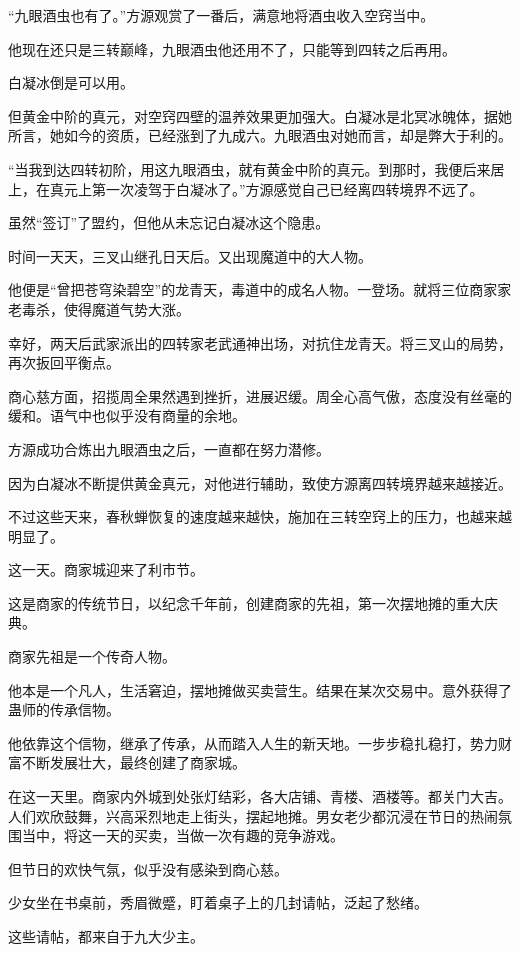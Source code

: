 \begin{this_body}
“九眼酒虫也有了。”方源观赏了一番后，满意地将酒虫收入空窍当中。

他现在还只是三转巅峰，九眼酒虫他还用不了，只能等到四转之后再用。

白凝冰倒是可以用。

但黄金中阶的真元，对空窍四壁的温养效果更加强大。白凝冰是北冥冰魄体，据她所言，她如今的资质，已经涨到了九成六。九眼酒虫对她而言，却是弊大于利的。

“当我到达四转初阶，用这九眼酒虫，就有黄金中阶的真元。到那时，我便后来居上，在真元上第一次凌驾于白凝冰了。”方源感觉自己已经离四转境界不远了。

虽然“签订”了盟约，但他从未忘记白凝冰这个隐患。

时间一天天，三叉山继孔日天后。又出现魔道中的大人物。

他便是“曾把苍穹染碧空”的龙青天，毒道中的成名人物。一登场。就将三位商家家老毒杀，使得魔道气势大涨。

幸好，两天后武家派出的四转家老武通神出场，对抗住龙青天。将三叉山的局势，再次扳回平衡点。

商心慈方面，招揽周全果然遇到挫折，进展迟缓。周全心高气傲，态度没有丝毫的缓和。语气中也似乎没有商量的余地。

方源成功合炼出九眼酒虫之后，一直都在努力潜修。

因为白凝冰不断提供黄金真元，对他进行辅助，致使方源离四转境界越来越接近。

不过这些天来，春秋蝉恢复的速度越来越快，施加在三转空窍上的压力，也越来越明显了。

这一天。商家城迎来了利市节。

这是商家的传统节日，以纪念千年前，创建商家的先祖，第一次摆地摊的重大庆典。

商家先祖是一个传奇人物。

他本是一个凡人，生活窘迫，摆地摊做买卖营生。结果在某次交易中。意外获得了蛊师的传承信物。

他依靠这个信物，继承了传承，从而踏入人生的新天地。一步步稳扎稳打，势力财富不断发展壮大，最终创建了商家城。

在这一天里。商家内外城到处张灯结彩，各大店铺、青楼、酒楼等。都关门大吉。人们欢欣鼓舞，兴高采烈地走上街头，摆起地摊。男女老少都沉浸在节日的热闹氛围当中，将这一天的买卖，当做一次有趣的竞争游戏。

但节日的欢快气氛，似乎没有感染到商心慈。

少女坐在书桌前，秀眉微蹙，盯着桌子上的几封请帖，泛起了愁绪。

这些请帖，都来自于九大少主。


\end{this_body}
